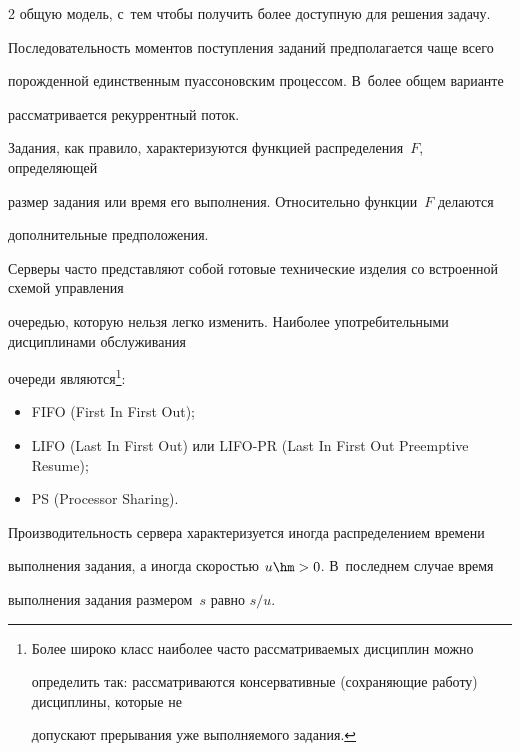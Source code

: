 \begin{multicols}{2}
общую модель, с~тем чтобы получить более доступную для решения задачу.


    


    Последовательность моментов поступления заданий предполагается чаще всего 


порожденной единственным пуассоновским процессом. В~более общем варианте 


рассматривается рекуррентный поток.


    


    Задания, как правило, характеризуются функцией распределения~$F$, определяющей 


размер задания или время его выполнения. Относительно функции~$F$ делаются 


дополнительные предположения.


    


Серверы часто представляют собой готовые технические изделия со встроенной схемой управления 


очередью, которую нельзя легко изменить. Наиболее употребительными дисциплинами обслуживания 


очереди являются\footnote{Более широко класс наиболее часто рассматриваемых дисциплин можно 


определить так: рассматриваются консервативные (сохраняющие работу) дисциплины, которые не 


допускают прерывания уже выполняемого задания.}:


\begin{itemize}


\item FIFO (First In First Out);


    \item LIFO (Last In First Out) или LIFO-PR (Last In First Out Preemptive Resume);


    \item PS (Processor Sharing).


    \end{itemize}


    


    Производительность сервера характеризуется иногда распределением времени 


выполнения задания, а иногда скоростью $u\hm>0$. В~последнем случае время 


выполнения задания размером~$s$ равно $s/u$.



\end{multicols}
